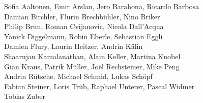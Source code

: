 %
%
%
Sofia Aaltonen,		%
Emir Arslan, 		%
Jero Barahona,		%
Ricardo Barbosa%
\\
Damian Birchler,	%
Flurin Brechbühler,	%
Nino Briker%
\\
Philip Brun,		%
Roman Cvijanovic,	%
Nicola Dall'Acqua%
\\
Yanick Diggelmann,	%
Robin Eberle,		%
Sebastian Eggli%
\\
Damien Flury,		%
Laurin Heitzer,		%
Andrin Kälin%
\\
Shaarujan Kamalanathan,	%
Alain Keller,		%
Martina Knobel%
\\
Gian Kraus,		%
Patrik Müller,		%
Joël Rechsteiner,	%
Mike Peng%
\\
Andrin Rütsche,		%
Michael Schmid,		%
Lukas Schöpf%
\\
Fabian Steiner,		%
Loris Trüb,		%
Raphael Unterer,	%
Pascal Widmer%
\\
Tobias Zuber%
\\
